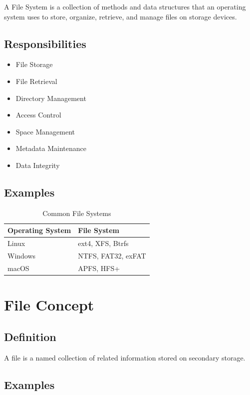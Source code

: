 A File System is a collection of methods and data structures that an operating system uses to store, organize, retrieve, and manage files on storage devices.

\subsection{Responsibilities}

\begin{itemize}
\item File Storage
\item File Retrieval
\item Directory Management
\item Access Control
\item Space Management
\item Metadata Maintenance
\item Data Integrity
\end{itemize}

\subsection{Examples}

\begin{table}[h]
\centering
\begin{tabular}{|l|l|}
\hline
Operating System & File System \\
\hline
Linux & ext4, XFS, Btrfs \\
Windows & NTFS, FAT32, exFAT \\
macOS & APFS, HFS+ \\
\hline
\end{tabular}
\caption{Common File Systems}
\end{table}

\section{File Concept}

\subsection{Definition}

A file is a named collection of related information stored on secondary storage.

\subsection{Examples}

